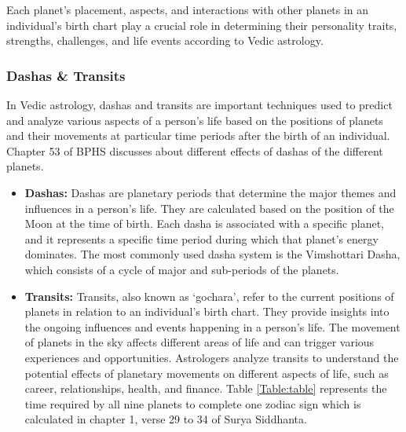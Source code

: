Each planet's placement, aspects, and interactions with other planets in an individual's birth chart play a crucial role in determining their personality traits, strengths, challenges, and life events according to Vedic astrology.

\subsubsection{Dashas \& Transits}
In Vedic astrology, dashas and transits are important techniques used to predict and analyze various aspects of a person's life based on the positions of planets and their movements at particular time periods after the birth of an individual. Chapter 53 of BPHS\cite{BrihatParasharHoraShastraVol1, BrihatParasharHoraShastraVol2, wiki:bphs} discusses about different effects of dashas of the different planets.

\begin{itemize}
	\item \textbf{Dashas:} Dashas are planetary periods that determine the major themes and influences in a person's life. They are calculated based on the position of the Moon at the time of birth. Each dasha is associated with a specific planet, and it represents a specific time period during which that planet's energy dominates. The most commonly used dasha system is the Vimshottari Dasha, which consists of a cycle of major and sub-periods of the planets.
	\item \textbf{Transits:} Transits, also known as `gochara', refer to the current positions of planets in relation to an individual's birth chart. They provide insights into the ongoing influences and events happening in a person's life. The movement of planets in the sky affects different areas of life and can trigger various experiences and opportunities. Astrologers analyze transits to understand the potential effects of planetary movements on different aspects of life, such as career, relationships, health, and finance. Table \ref{Table:table} represents the time required by all nine planets to complete one zodiac sign which is calculated in chapter 1, verse 29 to 34 of Surya Siddhanta\cite{SuryaSiddhanta, wiki:ss}.
\end{itemize}


